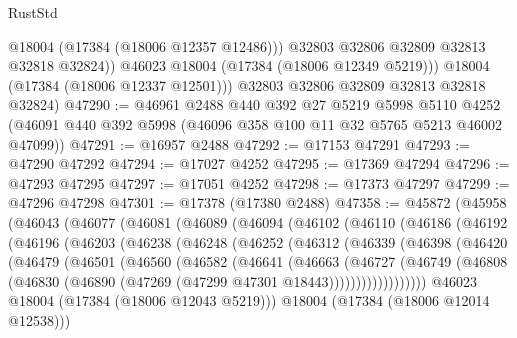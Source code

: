 \begin{lexlean}{RustStd}
\begin{coremodule}
                @18004
                (@17384 (@18006 @12357 @12486)))
              @32803
              @32806
              @32809
              @32813
              @32818
              @32824))
          @46023
          @18004
          (@17384 (@18006 @12349 @5219)))
        @18004
        (@17384 (@18006 @12337 @12501)))
      @32803
      @32806
      @32809
      @32813
      @32818
      @32824)
@47290 := @46961
    @2488
    @440
    @392
    @27
    @5219
    @5998
    @5110
    @4252
    (@46091 @440 @392 @5998 (@46096 @358 @100 @11 @32 @5765 @5213 @46002 @47099))
@47291 := @16957 @2488
@47292 := @17153 @47291
@47293 := @47290 @47292
@47294 := @17027 @4252
@47295 := @17369 @47294
@47296 := @47293 @47295
@47297 := @17051 @4252
@47298 := @17373 @47297
@47299 := @47296 @47298
@47301 := @17378 (@17380 @2488)
@47358 := @45872
    (@45958
      (@46043
        (@46077
          (@46081
            (@46089
              (@46094
                (@46102
                  (@46110
                    (@46186
                      (@46192
                        (@46196
                          (@46203
                            (@46238
                              (@46248
                                (@46252
                                  (@46312
                                    (@46339
                                      (@46398
                                        (@46420
                                          (@46479
                                            (@46501
                                              (@46560
                                                (@46582
                                                  (@46641
                                                    (@46663
                                                      (@46727
                                                        (@46749
                                                          (@46808
                                                            (@46830
                                                              (@46890
                                                                (@47269
                                                                  (@47299
                                                                    @47301
                                                                    @18443))))))))))))))))))
                                @46023
                                @18004
                                (@17384 (@18006 @12043 @5219)))
                              @18004
                              (@17384 (@18006 @12014 @12538)))

\end{coremodule}
\end{lexlean}
